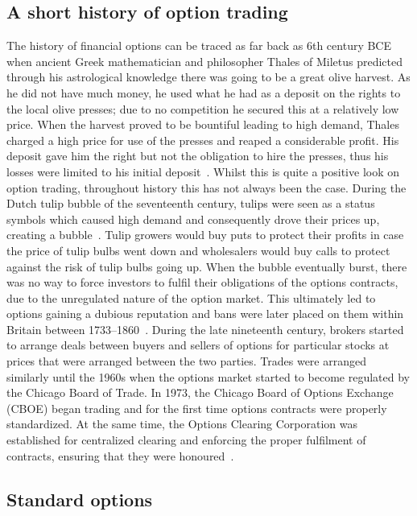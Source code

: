 \subsection{A short history of option trading}
The history of financial options can be traced as far back as 6th century BCE when ancient Greek mathematician and philosopher Thales of Miletus predicted through his astrological knowledge there was going to be a great olive harvest. As he did not have much money, he used what he had as a deposit on the rights to the local olive presses; due to no competition he secured this at a relatively low price. When the harvest proved to be bountiful leading to high demand, Thales charged a high price for use of the presses and reaped a considerable profit. His deposit gave him the right but not the obligation to hire the presses, thus his losses were limited to his initial deposit~\cite{OptionFirst, 1877aristotle}.
\nline{}
Whilst this is quite a positive look on option trading, throughout history this has not always been the case. During the Dutch tulip bubble of the seventeenth century, tulips were seen as a status symbols which caused high demand and consequently drove their prices up, creating a bubble~\cite{dash2011tulipomania}. Tulip growers would buy puts to protect their profits in case the price of tulip bulbs went down and wholesalers would buy calls to protect against the risk of tulip bulbs going up. When the bubble eventually burst, there was no way to force investors to fulfil their obligations of the options contracts, due to the unregulated nature of the option market. This ultimately led to options gaining a dubious reputation and bans were later placed on them within Britain between 1733--1860~\cite{OptionBan}. 
\nline{}
During the late nineteenth century, brokers started to arrange deals between buyers and sellers of options for particular stocks at prices that were arranged between the two parties. Trades were arranged similarly until the 1960s when the options market started to become regulated by the Chicago Board of Trade. In 1973, the Chicago Board of Options Exchange (CBOE) began trading and for the first time options contracts were properly standardized. At the same time, the Options Clearing Corporation was established for centralized clearing and enforcing the proper fulfilment of contracts, ensuring that they were honoured~\cite{markham2002financial}.

\subsection{Standard options}

